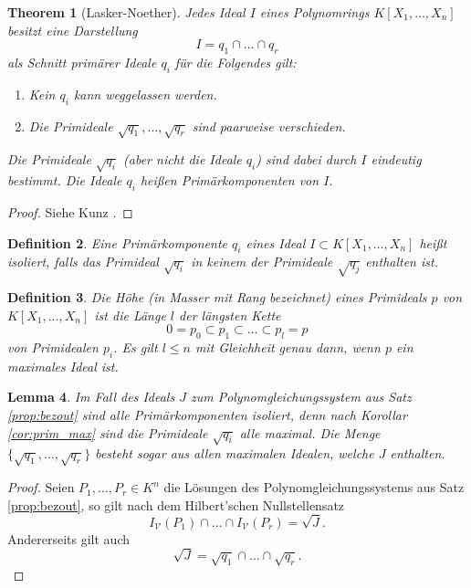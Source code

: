 \documentclass[a4paper,oneside, 11pt, openany%
]{article}
\theoremstyle{custom}
\newtheorem{theorem}{Theorem}[section]
\newtheorem{lemma}[theorem]{Lemma}
\theoremstyle{custom}
\newtheorem{definition}[theorem]{Definition}
\begin{document}
	\begin{theorem}[Lasker-Noether]
		Jedes Ideal $I$ eines Polynomrings $K[X_1,\ldots,X_n]$ besitzt eine Darstellung
		\[I = q_1 \cap \ldots \cap q_r\]
		als Schnitt primärer Ideale $q_i$ für die Folgendes gilt:
		\begin{enumerate}
			\item Kein $q_i$ kann weggelassen werden.
			\item Die Primideale $\sqrt{q_1}, \ldots, \sqrt{q_r}$ sind paarweise verschieden.
		\end{enumerate}
		Die Primideale $\sqrt{q_i}$ (aber nicht die Ideale $q_i$) sind dabei durch $I$ eindeutig bestimmt. Die Ideale $q_i$ heißen Primärkomponenten von $I$.
	\end{theorem}
	\begin{proof}
		Siehe Kunz \cite{kunz2012introduction}.
	\end{proof}
	\begin{definition}
		Eine Primärkomponente $q_i$ eines Ideal $I \subset K[X_1,\ldots,X_n]$ heißt isoliert, falls das Primideal $\sqrt{q_i}$ in keinem der Primideale $\sqrt{q_j}$ enthalten ist.
	\end{definition}
	\begin{definition}
		Die Höhe (in Masser \cite{masser1983fields} mit Rang bezeichnet) eines Primideals $p$ von $K[X_1,\ldots,X_n]$ ist die Länge $l$ der längsten Kette \[0=p_0 \subset p_1 \subset \ldots \subset p_l = p\] von Primidealen $p_i$. Es gilt $l \leq n$ mit Gleichheit genau dann, wenn $p$ ein maximales Ideal ist.
	\end{definition}
	\begin{lemma}\label{cor:gls_prim_max}
		Im Fall des Ideals $J$ zum Polynomgleichungssystem aus Satz \ref{prop:bezout} sind alle
		Primärkomponenten isoliert, denn nach Korollar \ref{cor:prim_max} sind  die Primideale $\sqrt{q_i}$ alle maximal. Die Menge $\{\sqrt{q_1},\ldots,\sqrt{q_r}\}$ besteht sogar aus allen maximalen Idealen, welche $J$ enthalten.
	\end{lemma}
	\begin{proof}
		Seien $P_1, \ldots, P_r \in K^n$ die Lösungen des Polynomgleichungssystems aus Satz \ref{prop:bezout}, so gilt nach dem Hilbert'schen Nullstellensatz \cite{kunz2013}
		\begin{equation*}
			I_\mathcal{V}(P_1) \cap \ldots \cap I_\mathcal{V}(P_r) = \sqrt{J}.
		\end{equation*}
		Andererseits gilt auch
		\begin{equation*}
			\sqrt{J} = \sqrt{q_1} \cap \ldots \cap \sqrt{q_r}.
		\end{equation*}
	\end{proof}
\end{document}
